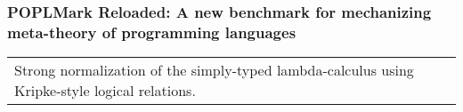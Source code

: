 \title[POPLMark Reloaded!]
{}


\author[A. Abel, A. Momigliano, B. Pientka]{Andreas Abel  \and Alberto Momigliano 
             \and Brigitte Pientka }




%   
% 


\sf
\maketitle

\newcommand{\bbox}{--}

\newcommand{\impl}{\supset}
\newcommand{\xmark}{\text{\ding{55}}}


\begin{frame}\frametitle{POPLMark Reloaded: A new benchmark for mechanizing meta-theory of programming languages}%

\Large
\begin{center}
\begin{tabular}{p{10cm}}
Strong normalization of the simply-typed lambda-calculus using
Kripke-style  %
logical relations.
\end{tabular}
\end{center}




\end{frame}

